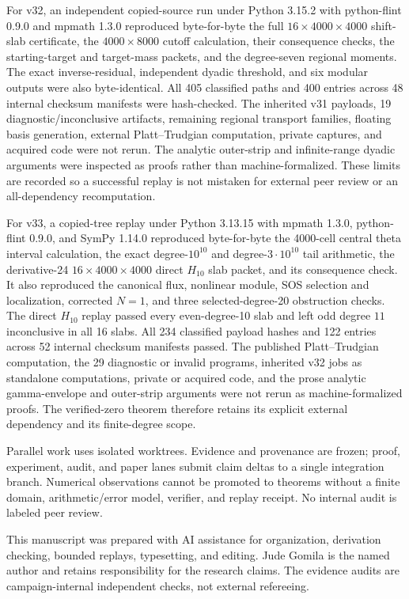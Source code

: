\documentclass[11pt]{article}
\theoremstyle{definition}
\theoremstyle{remark}
\begin{document}
For v32, an independent copied-source run under Python 3.15.2 with python-flint
0.9.0 and mpmath 1.3.0 reproduced byte-for-byte the full
$16\times4000\times4000$ shift-slab certificate, the $4000\times8000$ cutoff
calculation, their consequence checks, the starting-target and target-mass
packets, and the degree-seven regional moments. The exact inverse-residual,
independent dyadic threshold, and six modular outputs were also byte-identical.
All 405 classified paths and 400 entries across 48 internal checksum manifests
were hash-checked. The inherited v31 payloads, 19 diagnostic/inconclusive
artifacts, remaining regional transport families, floating basis generation,
external Platt--Trudgian computation, private captures, and acquired code were
not rerun. The analytic outer-strip and infinite-range dyadic arguments were
inspected as proofs rather than machine-formalized. These limits are recorded
so a successful replay is not mistaken for external peer review or an
all-dependency recomputation.

For v33, a copied-tree replay under Python 3.13.15 with mpmath 1.3.0,
python-flint 0.9.0, and SymPy 1.14.0 reproduced byte-for-byte the 4000-cell
central theta interval calculation, the exact degree-$10^{10}$ and
degree-$3\cdot10^{10}$ tail arithmetic, the derivative-24
$16\times4000\times4000$ direct $H_{10}$ slab packet, and its consequence
check. It also reproduced the canonical flux, nonlinear module, SOS selection
and localization, corrected $N=1$, and three selected-degree-20 obstruction
checks. The direct $H_{10}$ replay passed every even-degree-10 slab and left
odd degree $11$ inconclusive in all 16 slabs. All 234 classified payload hashes
and 122 entries across 52 internal checksum manifests passed. The published
Platt--Trudgian computation, the 29 diagnostic or invalid programs, inherited
v32 jobs as standalone computations, private or acquired code, and the prose
analytic gamma-envelope and outer-strip arguments were not rerun as
machine-formalized proofs. The verified-zero theorem therefore retains its
explicit external dependency and its finite-degree scope.

Parallel work uses isolated worktrees. Evidence and provenance are frozen;
proof, experiment, audit, and paper lanes submit claim deltas to a single
integration branch. Numerical observations cannot be promoted to theorems
without a finite domain, arithmetic/error model, verifier, and replay receipt.
No internal audit is labeled peer review.

This manuscript was prepared with AI assistance for organization, derivation
checking, bounded replays, typesetting, and editing. Jude Gomila is the named
author and retains responsibility for the research claims. The evidence audits
are campaign-internal independent checks, not external refereeing.
\end{document}
